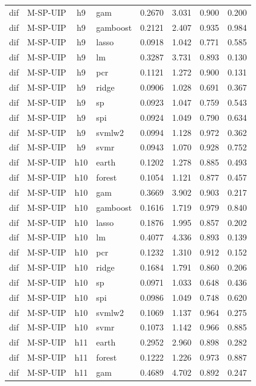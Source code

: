 \begin{ThreePartTable}
\begin{longtable}[t]{llclcccc}
dif & M-SP-UIP & h9 & gam & 0.2670 & 3.031 & 0.900 & 0.200\\
dif & M-SP-UIP & h9 & gamboost & 0.2121 & 2.407 & 0.935 & 0.984\\
dif & M-SP-UIP & h9 & lasso & 0.0918 & 1.042 & 0.771 & 0.585\\
dif & M-SP-UIP & h9 & lm & 0.3287 & 3.731 & 0.893 & 0.130\\
dif & M-SP-UIP & h9 & pcr & 0.1121 & 1.272 & 0.900 & 0.131\\
dif & M-SP-UIP & h9 & ridge & 0.0906 & 1.028 & 0.691 & 0.367\\
dif & M-SP-UIP & h9 & sp & 0.0923 & 1.047 & 0.759 & 0.543\\
dif & M-SP-UIP & h9 & spi & 0.0924 & 1.049 & 0.790 & 0.634\\
dif & M-SP-UIP & h9 & svmlw2 & 0.0994 & 1.128 & 0.972 & 0.362\\
dif & M-SP-UIP & h9 & svmr & 0.0943 & 1.070 & 0.928 & 0.752\\
\addlinespace
dif & M-SP-UIP & h10 & earth & 0.1202 & 1.278 & 0.885 & 0.493\\
dif & M-SP-UIP & h10 & forest & 0.1054 & 1.121 & 0.877 & 0.457\\
dif & M-SP-UIP & h10 & gam & 0.3669 & 3.902 & 0.903 & 0.217\\
dif & M-SP-UIP & h10 & gamboost & 0.1616 & 1.719 & 0.979 & 0.840\\
dif & M-SP-UIP & h10 & lasso & 0.1876 & 1.995 & 0.857 & 0.202\\
dif & M-SP-UIP & h10 & lm & 0.4077 & 4.336 & 0.893 & 0.139\\
dif & M-SP-UIP & h10 & pcr & 0.1232 & 1.310 & 0.912 & 0.152\\
dif & M-SP-UIP & h10 & ridge & 0.1684 & 1.791 & 0.860 & 0.206\\
dif & M-SP-UIP & h10 & sp & 0.0971 & 1.033 & 0.648 & 0.436\\
dif & M-SP-UIP & h10 & spi & 0.0986 & 1.049 & 0.748 & 0.620\\
dif & M-SP-UIP & h10 & svmlw2 & 0.1069 & 1.137 & 0.964 & 0.275\\
dif & M-SP-UIP & h10 & svmr & 0.1073 & 1.142 & 0.966 & 0.885\\
\addlinespace
dif & M-SP-UIP & h11 & earth & 0.2952 & 2.960 & 0.898 & 0.282\\
dif & M-SP-UIP & h11 & forest & 0.1222 & 1.226 & 0.973 & 0.887\\
dif & M-SP-UIP & h11 & gam & 0.4689 & 4.702 & 0.892 & 0.247\\

\end{longtable}
\end{ThreePartTable}
